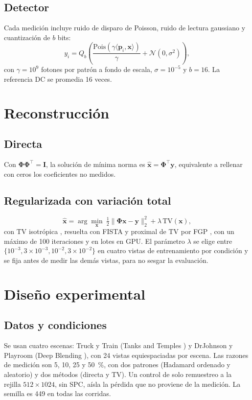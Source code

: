 \documentclass[conference]{IEEEtran}
\begin{document}
\subsection{Detector}
Cada medición incluye ruido de disparo de Poisson, ruido de lectura gaussiano y cuantización de $b$ bits:
\begin{equation}
y_i=Q_b\!\left(\frac{\mathrm{Pois}(\gamma\langle\mathbf{p}_i,\mathbf{x}\rangle)}{\gamma}+\mathcal{N}(0,\sigma^2)\right),
\end{equation}
con $\gamma=10^{9}$ fotones por patrón a fondo de escala, $\sigma=10^{-5}$ y $b=16$. La referencia DC se promedia 16 veces.

\section{Reconstrucción}
\subsection{Directa}
Con $\mathbf{\Phi}\mathbf{\Phi}^{\top}=\mathbf{I}$, la solución de mínima norma es
$\hat{\mathbf{x}}=\mathbf{\Phi}^{\top}\mathbf{y}$, equivalente a rellenar con ceros los coeficientes no medidos.

\subsection{Regularizada con variación total}
\begin{equation}
\hat{\mathbf{x}}=\arg\min_{\mathbf{x}}\ \tfrac12\|\mathbf{\Phi}\mathbf{x}-\mathbf{y}\|_2^2+\lambda\,\mathrm{TV}(\mathbf{x}),
\label{eq:tv}
\end{equation}
con TV isotrópica \cite{rudin1992}, resuelta con FISTA \cite{beck2009fista} y proximal de TV por FGP
\cite{beck2009tv}, con un máximo de 100 iteraciones y en lotes en GPU. El parámetro $\lambda$ se elige entre
$\{10^{-3},3\!\times\!10^{-3},10^{-2},3\!\times\!10^{-2}\}$ en cuatro vistas de entrenamiento por condición y se fija
antes de medir las demás vistas, para no sesgar la evaluación.

\section{Diseño experimental}
\subsection{Datos y condiciones}
Se usan cuatro escenas: Truck y Train (Tanks and Temples \cite{knapitsch2017}) y DrJohnson y Playroom (Deep Blending
\cite{hedman2018}), con 24 vistas equiespaciadas por escena. Las razones de medición son 5, 10, 25 y 50~\%, con dos
patrones (Hadamard ordenado y aleatorio) y dos métodos (directa y TV). Un control de solo remuestreo a la rejilla
$512\times1024$, sin SPC, aísla la pérdida que no proviene de la medición. La semilla es 449 en todas las corridas.
\end{document}
